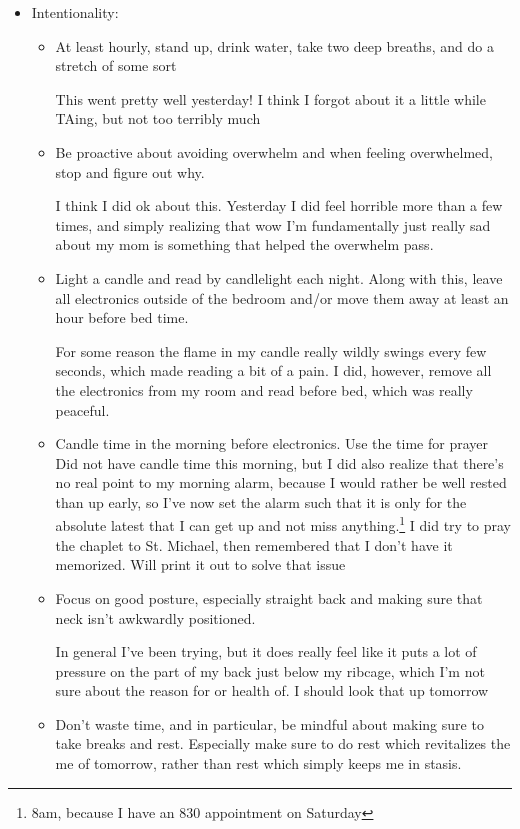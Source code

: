\documentclass[12pt]{article}[titlepage]
\renewcommand{\,}{\textsuperscript{,}}
\begin{document}
\begin{itemize}   
\item Intentionality:  
\begin{itemize}  
\item At least hourly, stand up, drink water, take two deep breaths, and do a stretch of some sort

This went pretty well yesterday! I think I forgot about it a little while TAing, but not too terribly much  
\item Be proactive about avoiding overwhelm and when feeling overwhelmed, stop and figure out why.

I think I did ok about this. Yesterday I did feel horrible more than a few times, and simply realizing that wow I'm fundamentally just really sad about my mom is something that helped the overwhelm pass.  
\item Light a candle and read by candlelight each night. Along with this, leave all electronics outside of the bedroom and/or move them away at least an hour before bed time.

For some reason the flame in my candle really wildly swings every few seconds, which made reading a bit of a pain.  
I did, however, remove all the electronics from my room and read before bed, which was really peaceful.  
\item Candle time in the morning before electronics. Use the time for prayer  
Did not have candle time this morning, but I did also realize that there's no real point to my morning alarm, because I would rather be well rested than up early, so I've now set the alarm such that it is only for the absolute latest that I can get up and not miss anything.\footnote{8am, because I have an 830 appointment on Saturday}  
I did try to pray the chaplet to St. Michael, then remembered that I don't have it memorized. Will print it out to solve that issue  
\item Focus on good posture, especially straight back and making sure that neck isn't awkwardly positioned.

In general I've been trying, but it does really feel like it puts a lot of pressure on the part of my back just below my ribcage, which I'm not sure about the reason for or health of. I should look that up tomorrow

\item Don't waste time, and in particular, be mindful about making sure to take breaks and rest. Especially make sure to do rest which revitalizes the me of tomorrow, rather than rest which simply keeps me in stasis.


\end{itemize}
\end{itemize}
\end{document}
